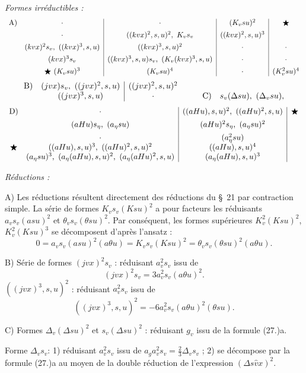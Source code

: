 \documentclass[11pt]{article}
\newcommand{\A}{\Delta}
\begin{document}
\noindent\emph{Formes irréductibles :}
\[
\begin{array}{c@{\quad}c|c|c|c}
\text{A)}& \cdot & \cdot & (K_v su)^2 & \bigstar\\[0.45em]
& \cdot & ((kv x)^2,s,u)^2,\ K_v s_v & ((kv x)^2,s,u)^3 & \\[0.45em]
& (kv x)^2s_v,\ ((kv x)^3,s,u) & ((kv x)^3,s,u)^2 & \cdot & \cdot\\[0.45em]
& (kv x)^3s_v & ((kv x)^3,s,u)s_v,\ (K_v(kv x)^3,s,u) & \cdot & \cdot\\[0.45em]
& \bigstar\ (K_v su)^3 & (K_v su)^4 & \cdot & (K_v^2su)^4
\end{array}
\]
\[
\begin{array}{c@{\quad}c|c@{\qquad}c@{\quad}c}
\text{B)}& (jv x)s_v,\ ((jv x)^2,s,u) & ((jv x)^2,s,u)^2 && \\
& ((jv x)^3,s,u) & \cdot && \text{C)}\quad s_v(\A su),\ (\A_v su),
\end{array}
\]
\[
\begin{array}{c@{\quad}c|c|c}
\text{D)}& \cdot & ((aHu),s,u)^2,\ ((aHu)^2,s,u) & \bigstar\\[0.45em]
& (aHu)s_\eta,\ (a_\eta su) & (aHu)^2s_\eta,\ (a_\eta su)^2 & \\[0.45em]
& \cdot & (a_\eta^2su) & \\
\bigstar& ((aHu),s,u)^3,\ ((aHu)^2,s,u)^2 & ((aHu),s,u)^4 & \\
& (a_\eta su)^3,\ (a_\eta(aHu),s,u)^2,\ (a_\eta(aHu)^2,s,u) & (a_\eta(aHu),s,u)^3 &
\end{array}
\]

\noindent\emph{Réductions :}

A) Les réductions résultent directement des réductions du \S\ 21 par contraction simple. La série de formes $K_v s_v(Ksu)^2$ a pour facteurs les réduisants $a_v s_v(asu)^2$ et $\theta_v s_v(\theta su)^2$. Par conséquent, les formes supérieures $K_v^2(Ksu)^2$, $K_v^2(Ksu)^3$ se décomposent d'après l'ansatz :
\[
0=a_v s_v(asu)^2(a\theta u)=K_v s_v(Ksu)^2=\theta_v s_v(\theta su)^2(a\theta u).
\]

B) Série de formes $(jv x)^2s_v$ : réduisant $a_v^2s_v$ issu de
\[
(jv x)^2s_v=3a_v^2s_v(a\theta u)^2.
\]
$((jv x)^3,s,u)^2$ : réduisant $a_v^2s_v$ issu de
\[
((jv x)^3,s,u)^2=-6a_v^2s_v(a\theta u)^2(\theta su).
\]

C) Formes $\A_v(\A su)^2$ et $s_v(\A su)^2$ : réduisant $g_v$ issu de la formule (27.)a.

Forme $\A_v s_v$:
1) réduisant $a_v^2s_v$ issu de $a_ga_v^2s_v=\frac23\A_v s_v$ ;
2) se décompose par la formule (27.)a au moyen de la double réduction de l'expression $(\A s\widehat vx)^2$.
\end{document}
